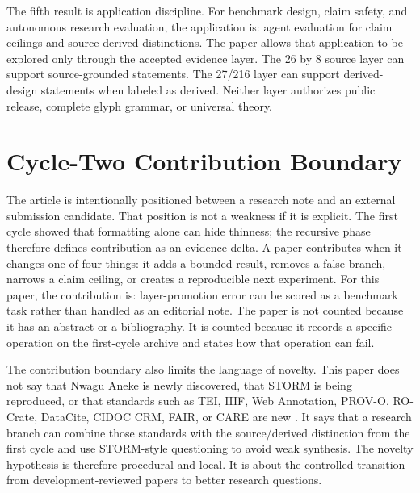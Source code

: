 \documentclass[sigconf,nonacm]{acmart}
\begin{document}
The fifth result is application discipline. For benchmark design, claim safety, and autonomous research evaluation, the application is:
agent evaluation for claim ceilings and source-derived distinctions. The paper allows that application to be explored only through the
accepted evidence layer. The 26 by 8 source layer can support source-grounded
statements. The 27/216 layer can support derived-design statements when labeled
as derived. Neither layer authorizes public release, complete glyph grammar, or
universal theory.


\section{Cycle-Two Contribution Boundary}
The article is intentionally positioned between a research note and an external
submission candidate. That position is not a weakness if it is explicit. The
first cycle showed that formatting alone can hide thinness; the recursive phase
therefore defines contribution as an evidence delta. A paper contributes when it
changes one of four things: it adds a bounded result, removes a false branch,
narrows a claim ceiling, or creates a reproducible next experiment. For this
paper, the contribution is: layer-promotion error can be scored as a benchmark task rather than handled as an editorial note. The paper is not counted because it has an
abstract or a bibliography. It is counted because it records a specific
operation on the first-cycle archive and states how that operation can fail.

The contribution boundary also limits the language of novelty. This paper does
not say that Nwagu Aneke is newly discovered, that STORM is being reproduced, or
that standards such as TEI, IIIF, Web Annotation, PROV-O, RO-Crate, DataCite,
CIDOC CRM, FAIR, or CARE are new \cite{teiP5Glyphs,iiifPresentation3,w3cAnnotationModel,w3cAnnotationVocab,w3cProvO,rocrate12,cidocCrm,datacite45,wilkinson2016fair,carroll2020care}. It says that a research
branch can combine those standards with the source/derived distinction from the
first cycle and use STORM-style questioning to avoid weak synthesis. The novelty
hypothesis is therefore procedural and local. It is about the controlled
transition from development-reviewed papers to better research questions.
\end{document}
